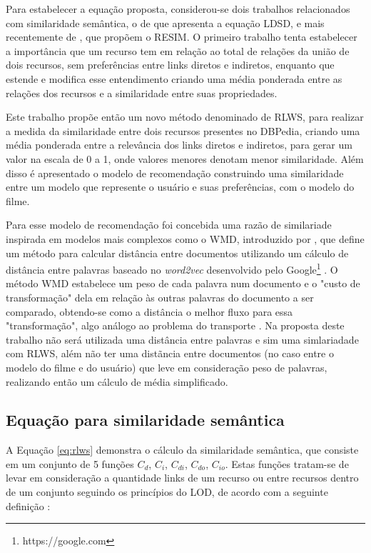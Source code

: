 Para estabelecer a equação proposta, considerou-se dois trabalhos relacionados com similaridade semântica, o de \cite{PassantLDSD} que apresenta a equação \ac{LDSD}, e mais recentemente de \cite{PiaoResim}, que propõem o \ac{RESIM}. O primeiro trabalho tenta estabelecer a importância que um recurso tem em relação ao total de relações da união de dois recursos, sem preferências entre links diretos e indiretos, enquanto que \cite{PiaoResim} estende e modifica esse entendimento criando uma média ponderada entre as relações dos recursos e a similaridade entre suas propriedades.

Este trabalho propõe então um novo método denominado de \ac{RLWS}, para realizar a medida da similaridade entre dois recursos presentes no DBPedia, criando uma média ponderada entre a relevância dos links diretos e indiretos, para gerar um valor na escala de 0 a 1, onde valores menores denotam menor similaridade. Além disso é apresentado o modelo de recomendação construindo uma similaridade entre um modelo que represente o usuário e suas preferências, com o modelo do filme. 

Para esse modelo de recomendação foi concebida uma razão de similariade inspirada em modelos mais complexos como o \ac{WMD}, introduzido por \cite{WMD:2015}, que define um método para calcular distância entre documentos utilizando um cálculo de distância entre palavras baseado no \textit{word2vec} desenvolvido pelo Google\footnote{https://google.com} \citep{word2vec:2013}. O método \ac{WMD} estabelece um peso de cada palavra num documento e o "custo de transformação" dela em relação às outras palavras do documento a ser comparado, obtendo-se como a distância o melhor fluxo para essa "transformação"\;, algo análogo ao problema do transporte \citep{Transporte:2016}. Na proposta deste trabalho não será utilizada uma distância entre palavras e sim uma simlariadade com \ac{RLWS}, além não ter uma distãncia entre documentos (no caso entre o modelo do filme e do usuário) que leve em consideração peso de palavras, realizando então um cálculo de média simplificado.

\subsection{Equação para similaridade semântica}
\label{ssec:formula_rlws}

A Equação \ref{eq:rlws} demonstra o cálculo da similaridade semântica, que consiste em um conjunto de 5 funções  $C_d$, $C_i$, $C_{di}$, $C_{do}$, $C_{io}$. Estas funções tratam-se de levar em consideração a quantidade links de um recurso ou entre recursos dentro de um conjunto seguindo os princípios do \ac{LOD}, de acordo com a seguinte definição \citep{PiaoResim}:

